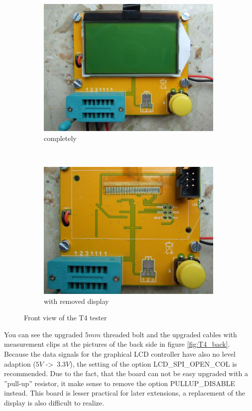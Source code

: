 \begin{figure}[H]
  \begin{subfigure}[b]{9cm}
    \centering
    \includegraphics[width=9cm]{../PNG/T4_front.JPG}
    \caption{completely}
  \end{subfigure}
  ~
  \begin{subfigure}[b]{9cm}
    \centering
    \includegraphics[width=9cm]{../PNG/T4_front_noLCD.JPG}
    \caption{with removed display}
  \end{subfigure}
  \caption{Front view of the T4 tester}
  \label{fig:T4_front}
\end{figure}

You can see the upgraded \(5mm\) threaded bolt and the upgraded cables with measurement clips
at the pictures of the back side in figure \ref{fig:T4_back}.
Because the data signals for the graphical LCD controller have also no
level adaption (\(5V\) -\textgreater~\(3.3V\)), the setting of the option LCD\_SPI\_OPEN\_COL is recommended.
Due to the fact, that the board can not be easy upgraded with a ''pull-up'' resistor,
it make sense to remove the option PULLUP\_DISABLE instead. 
This board is lesser practical for later extensions, a replacement of the display is
also difficult to realize.

